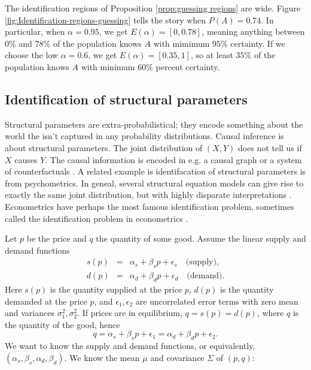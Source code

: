 The identification regions of Proposition \ref{prop:guessing regions}
are wide. Figure \ref{fig:Identification-regions-guessing} tells
the story when $P(A)=0.74$. In particular, when $\alpha=0.95$, we
get $E(\alpha)=[0,0.78]$, meaning anything between $0\%$ and $78\%$
of the population knows $A$ with mimimum $95\%$ certainty. If we
choose the low $\alpha=0.6$, we get $E(\alpha)=[0.35,1]$, so at
least $35\%$ of the population knows $A$ with minimum $60\%$ percent
certainty. 

\subsection{Identification of structural parameters}

Structural parameters are extra-probabilistical; they encode something
about the world the isn't captured in any probability distributions.
Causal inference is about structural parameters. The joint distribution
of $(X,Y)$ does not tell us if $X$ causes $Y$. The causal information
is encoded in e.g. a causal graph \parencite{Pearl2009-zf} or a system
of counterfactuals \parencite[Chapter 4]{Pearl2016-tc}. A related example
is identifacation of structural parameters is from psychometrics.
In geneal, several structural equation models can give rise to exactly
the same joint distribution, but with highly disparate interpretations
\parencite{Raykov2001-ap}. Econometrics have perhaps the most famous
identification problem, sometimes called the identification problem
in econometrics \parencite{Manski1999-ab}.
\begin{example}
 Let $p$ be the price and $q$ the quantity of some good. Assume
the linear supply and demand functions
\begin{eqnarray*}
s(p) & = & \alpha_{s}+\beta_{s}p+\epsilon_{s}\quad\textrm{(supply)},\\
d(p) & = & \alpha_{d}+\beta_{d}p+\epsilon_{d}\quad\textrm{(demand).}
\end{eqnarray*}
Here $s(p)$ is the quantity supplied at the price $p$, $d(p)$ is
the quantity demanded at the price $p$, and $\epsilon_{1},\epsilon_{2}$
are uncorrelated error terms with zero mean and variances $\sigma_{1}^{2},\sigma_{2}^{2}$.
If prices are in equilibrium, $q=s(p)=d(p)$, where $q$ is the quantity
of the good, hence
\[
q=\alpha_{s}+\beta_{s}p+\epsilon_{1}=\alpha_{d}+\beta_{d}p+\epsilon_{2}.
\]
We want to know the supply and demand functions, or equivalently,
$(\alpha_{s},\beta_{s},\alpha_{d},\beta_{d})$. We know the mean $\mu$
and covariance $\Sigma$ of $(p,q)$:
\end{example}

